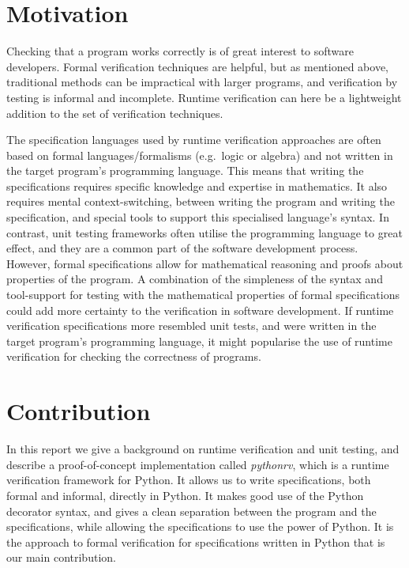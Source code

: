 \section{Motivation}

Checking that a program works correctly is of great interest to software
developers. Formal verification techniques are helpful, but as mentioned above,
traditional methods can be impractical with larger programs, and verification
by testing is informal and incomplete. Runtime verification can here be a
lightweight addition to the set of verification techniques.

The specification languages used by runtime verification approaches are often
based on formal languages/formalisms (e.g.\ logic or algebra) and not written
in the target program's programming language. This means that writing the
specifications requires specific knowledge and expertise in mathematics. It
also requires mental context-switching, between writing the program and writing
the specification, and special tools to support this specialised language's
syntax. In contrast, unit testing frameworks often utilise the programming
language to great effect, and they are a common part of the software
development process. However, formal specifications allow for mathematical
reasoning and proofs about properties of the program. A combination of the
simpleness of the syntax and tool-support for testing with the mathematical
properties of formal specifications could add more certainty to the
verification in software development. If runtime verification specifications
more resembled unit tests, and were written in the target program's programming
language, it might popularise the use of runtime verification for checking the
correctness of programs.


\section{Contribution}

In this report we give a background on runtime verification and unit testing,
and describe a proof-of-concept implementation called \textit{pythonrv}, which
is a runtime verification framework for Python. It allows us to write
specifications, both formal and informal, directly in Python. It makes good use
of the Python decorator syntax, and gives a clean separation between the
program and the specifications, while allowing the specifications to use the
power of Python. It is the approach to formal verification for specifications
written in Python that is our main contribution.

